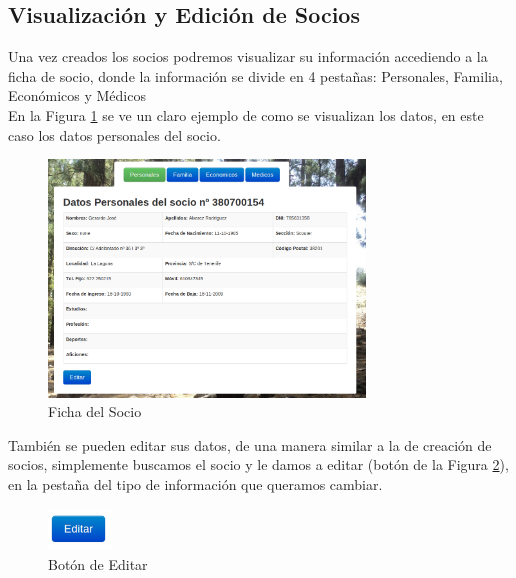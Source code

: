 \subsection{Visualización y Edición de Socios}

Una vez creados los socios podremos visualizar su información accediendo a la ficha de socio, donde la información se divide en 4 pestañas: Personales, Familia, Económicos y Médicos \\

En la Figura \ref{fig:ficha_socio} se ve un claro ejemplo de como se visualizan los datos, en este caso los datos personales del socio.\\

\begin{figure}[H]
\begin{center}
\includegraphics[width=0.75\textwidth]{images/datos_personales.jpg}
\caption{Ficha del Socio}
\label{fig:ficha_socio}
\end{center}
\end{figure}

También se pueden editar sus datos, de una manera similar a la de creación de socios, simplemente buscamos el socio y le damos a editar (botón de la Figura \ref{fig:edit}), en la pestaña del tipo de información
que queramos cambiar.\\

\begin{figure}[H]
\begin{center}
\includegraphics[width=0.15\textwidth]{images/boton_editar.jpg}
\caption{Botón de Editar}
\label{fig:edit}
\end{center}
\end{figure}

